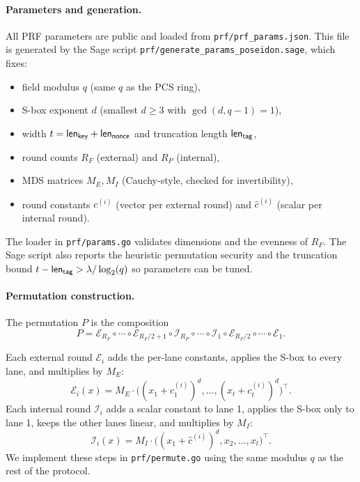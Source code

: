 
\paragraph{Parameters and generation.}
All PRF parameters are public and loaded from \texttt{prf/prf\_params.json}. This file is generated by the Sage script
\texttt{prf/generate\_params\_poseidon.sage}, which fixes:
\begin{itemize}
  \item field modulus $q$ (same $q$ as the PCS ring),
  \item S-box exponent $d$ (smallest $d\ge 3$ with $\gcd(d,q-1)=1$),
  \item width $t=\mathsf{len}_{\mathsf{key}}+\mathsf{len}_{\mathsf{nonce}}$ and truncation length $\mathsf{len}_{\mathsf{tag}}$,
  \item round counts $R_F$ (external) and $R_P$ (internal),
  \item MDS matrices $M_E,M_I$ (Cauchy-style, checked for invertibility),
  \item round constants $c^{(i)}$ (vector per external round) and $\hat c^{(i)}$ (scalar per internal round).
\end{itemize}
The loader in \texttt{prf/params.go} validates dimensions and the evenness of $R_F$. The Sage script also reports the
heuristic permutation security and the truncation bound $t-\mathsf{len}_{\mathsf{tag}}>\lambda/\log_2(q)$ so parameters can be tuned.

\paragraph{Permutation construction.}
The permutation $P$ is the composition
\[
P=\mathcal{E}_{R_F}\circ \cdots \circ \mathcal{E}_{R_F/2+1}\circ \mathcal{I}_{R_P}\circ \cdots \circ \mathcal{I}_1\circ
\mathcal{E}_{R_F/2}\circ \cdots \circ \mathcal{E}_1.
\]

Each external round $\mathcal{E}_i$ adds the per-lane constants, applies the S-box to every lane, and multiplies by $M_E$:
\[
\mathcal{E}_i(x)=M_E\cdot\big((x_1+c^{(i)}_1)^d,\dots,(x_t+c^{(i)}_t)^d\big)^\top.
\]
Each internal round $\mathcal{I}_i$ adds a scalar constant to lane 1, applies the S-box only to lane 1, keeps the other
lanes linear, and multiplies by $M_I$:
\[
\mathcal{I}_i(x)=M_I\cdot\big((x_1+\hat c^{(i)})^d,x_2,\dots,x_t\big)^\top.
\]
We implement these steps in \texttt{prf/permute.go} using the same modulus $q$ as the rest of the protocol.

